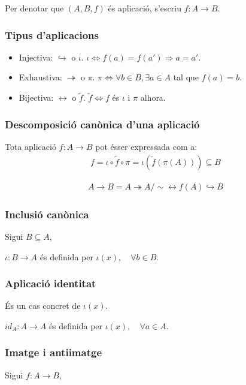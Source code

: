 Per denotar que $(A,B,f)$ és aplicació, s'escriu $f: A \to B$.

\subsubsection*{Tipus d'aplicacions}
\begin{itemize}
    \item Injectiva: $\hookrightarrow$ o $\iota$. 
        \subitem $\iota \Leftrightarrow f(a) = f(a') \Rightarrow a = a'$.
    \item Exhaustiva: $\twoheadrightarrow$ o $\pi$. 
        \subitem $\pi \Leftrightarrow \forall b \in B, \exists a \in A$ tal que $f(a) = b$.
    \item Bijectiva: $\leftrightarrow$ o $\tilde{f}$. 
        \subitem $\tilde{f} \Leftrightarrow f$ és $\iota$ i $\pi$ alhora.
\end{itemize}

\subsubsection*{Descomposició canònica d'una aplicació}
Tota aplicació $f:A \to B$ pot ésser expressada com a:
\begin{align}
    f = \iota \circ \tilde{f} \circ \pi = \iota ( \tilde{f} ( \pi (A))) \subseteq B
\end{align}

\begin{example}
\begin{align*}
    A \to B = A \twoheadrightarrow A / \sim \leftrightarrow f(A) \hookrightarrow B
\end{align*}
\end{example}

\subsubsection*{Inclusió canònica}
Sigui $B \subseteq A$,

$\iota: B \to A$ és definida per $\iota (x), \quad \forall b \in B$.

\subsubsection*{Aplicació identitat}
És un cas concret de $\iota (x)$.

$id_{A}: A \to A$ és definida per $\iota (x), \quad \forall a \in A$.

\subsubsection*{Imatge i antiimatge}
Sigui $f: A \to B$,

